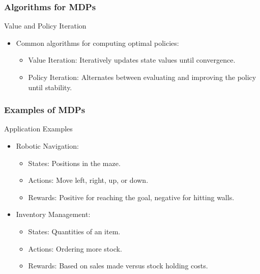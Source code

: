 \documentclass[aspectratio=169]{beamer}
\begin{document}
\begin{frame}[fragile]
    \frametitle{Algorithms for MDPs}
    \begin{block}{Value and Policy Iteration}
        \begin{itemize}
            \item Common algorithms for computing optimal policies:
            \begin{itemize}
                \item Value Iteration: Iteratively updates state values until convergence.
                \item Policy Iteration: Alternates between evaluating and improving the policy until stability.
            \end{itemize}
        \end{itemize}
    \end{block}
\end{frame}

\begin{frame}[fragile]
    \frametitle{Examples of MDPs}
    \begin{block}{Application Examples}
        \begin{itemize}
            \item Robotic Navigation:
            \begin{itemize}
                \item States: Positions in the maze.
                \item Actions: Move left, right, up, or down.
                \item Rewards: Positive for reaching the goal, negative for hitting walls.
            \end{itemize}
            \item Inventory Management:
            \begin{itemize}
                \item States: Quantities of an item.
                \item Actions: Ordering more stock.
                \item Rewards: Based on sales made versus stock holding costs.
            \end{itemize}
        \end{itemize}
    \end{block}
\end{frame}
\end{document}

